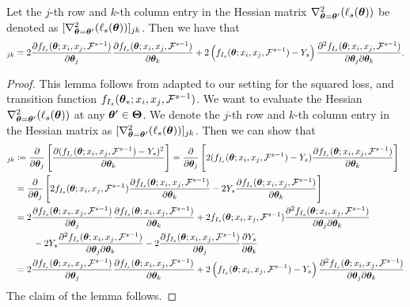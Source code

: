 \begin{lemma}
\label{lemma:support-lemma1}
Let the $j$-th row and $k$-th column entry in the Hessian matrix $\nabla^2_{\bm{\theta} = \bm{\theta}^{\prime}}(\ell_{s}(\bm{\theta}))$ be denoted as $[\nabla^2_{\bm{\theta} = \bm{\theta}^{\prime}}(\ell_{s}(\bm{\theta}))]_{jk}$. Then we have that
\begin{align*}
    [\nabla^2_{\btheta = \btheta^{\prime}}(\ell_{s}(\btheta))]_{jk} = 2 \dfrac{\partial f_{I_s}(\btheta; x_i, x_j, \F^{s-1})}{\partial \btheta_j}\dfrac{\partial f_{I_s}(\btheta; x_i, x_j, \F^{s-1})}{\partial \btheta_k} + 2\left(f_{I_s}(\btheta; x_i, x_j, \F^{s-1}) - Y_s\right)\dfrac{\partial^2 f_{I_s}(\btheta; x_i, x_j, \F^{s-1})}{\partial \btheta_j\partial\btheta_k}.
\end{align*}
\end{lemma}

\begin{proof}
This lemma follows from \citet{ frostig2015competing, mukherjee2020generalized} adapted to our setting for the squared loss, and transition function $f_{I_s}(\bm{\theta}_*; x_i, x_j, \mathcal{F}^{s-1})$. 
%
We want to evaluate the Hessian $\nabla^2_{\bm{\theta} = \bm{\theta}^{\prime}}(\ell_{s}(\bm{\theta}))$ at any $\bm{\theta}^{\prime}\in\bm{\Theta}$. We denote the $j$-th row and $k$-th column entry in the Hessian matrix as $[\nabla^2_{\bm{\theta} = \bm{\theta}^{\prime}}(\ell_{s}(\bm{\theta}))]_{jk}$. Then we can show that
\begin{align*}
    [\nabla^2_{\btheta = \btheta^{\prime}}(\ell_{s}(\btheta))]_{jk}&\coloneqq \frac{\partial }{\partial \btheta_j} \left[\frac{\partial (f_{I_s}(\btheta; x_i, x_j, \F^{s-1}) - Y_s)^2}{\partial \btheta_k}\right] = \frac{\partial }{\partial \btheta_j}\left[2(f_{I_s}(\btheta; x_i, x_j, \F^{s-1}) - Y_s) \frac{\partial f_{I_s}(\btheta; x_i, x_j, \F^{s-1})}{\partial \btheta_k}\right]\\
    &= \frac{\partial }{\partial \btheta_j}\left[ 2f_{I_s}(\btheta; x_i, x_j, \F^{s-1})\dfrac{\partial f_{I_s}(\btheta; x_i, x_j, \F^{s-1})}{\partial \btheta_k} - 2Y_s\dfrac{\partial f_{I_s}(\btheta; x_i, x_j, \F^{s-1})}{\partial \btheta_k}\right]\\
    &= 2 \dfrac{\partial f_{I_s}(\btheta; x_i, x_j, \F^{s-1})}{\partial \btheta_j}\dfrac{\partial f_{I_s}(\btheta; x_i, x_j, \F^{s-1})}{\partial \btheta_k} + 2 f_{I_s}(\btheta; x_i, x_j, \F^{s-1})\dfrac{\partial^2 f_{I_s}(\btheta; x_i, x_j, \F^{s-1})}{\partial \btheta_j\partial\btheta_k} \\
    &\qquad - 2 Y_s\dfrac{\partial^2 f_{I_s}(\btheta; x_i, x_j, \F^{s-1})}{\partial \btheta_j\partial\btheta_k} - 2 \dfrac{\partial f_{I_s}(\btheta; x_i, x_j, \F^{s-1})}{\partial \btheta_j}\dfrac{\partial Y_s}{\partial \btheta_k}\\
    &= 2 \dfrac{\partial f_{I_s}(\btheta; x_i, x_j, \F^{s-1})}{\partial \btheta_j}\dfrac{\partial f_{I_s}(\btheta; x_i, x_j, \F^{s-1})}{\partial \btheta_k} + 2\left(f_{I_s}(\btheta; x_i, x_j, \F^{s-1}) - Y_s\right)\dfrac{\partial^2 f_{I_s}(\btheta; x_i, x_j, \F^{s-1})}{\partial \btheta_j\partial\btheta_k}
\end{align*}
The claim of the lemma follows.
\end{proof}


